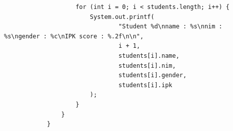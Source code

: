 \documentclass[12pt,titlepage]{article}
\begin{document}
\begin{enumerate}
{\begin{verbatim}
                    for (int i = 0; i < students.length; i++) {
                        System.out.printf(
                                "Student %d\nname : %s\nnim : %s\ngender : %c\nIPK score : %.2f\n\n",
                                i + 1,
                                students[i].name,
                                students[i].nim,
                                students[i].gender,
                                students[i].ipk
                        );
                    }
                }
            }

        \end{verbatim}
    }
\end{enumerate}
\end{document}
